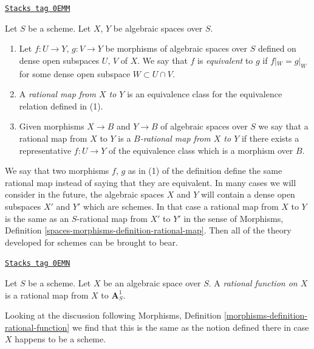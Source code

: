 \begin{definition}
\label{spaces-morphisms-definition-rational-map}
\href{https://stacks.math.columbia.edu/tag/0EMM}{\texttt{Stacks tag 0EMM}}

Let $S$ be a scheme. Let $X$, $Y$ be algebraic spaces over $S$.
\begin{enumerate}
\item Let $f : U \to Y$, $g : V \to Y$ be morphisms of algebraic spaces
over $S$ defined on dense open subspaces $U$, $V$ of $X$. We say that $f$ is
{\it equivalent} to $g$ if $f|_W = g|_W$ for some dense open
subspace $W \subset U \cap V$.
\item A {\it rational map from $X$ to $Y$}
is an equivalence class for the equivalence relation defined in (1).
\item Given morphisms $X \to B$ and $Y \to B$ of algebraic spaces over $S$
we say that a rational map from $X$ to $Y$ is a
{\it $B$-rational map from $X$ to $Y$}
if there exists a representative $f : U \to Y$ of the equivalence
class which is a morphism over $B$.
\end{enumerate}
\end{definition}

We say that two morphisms $f$, $g$ as in (1) of the definition
define the same rational map instead of saying that they are equivalent.
In many cases we will consider in the future, the algebraic spaces
$X$ and $Y$ will contain a dense open subspaces $X'$ and $Y'$ which
are schemes. In that case a rational map from $X$ to $Y$ is the same
as an $S$-rational map from $X'$ to $Y'$ in the sense of
Morphisms, Definition \ref{spaces-morphisms-definition-rational-map}.
Then all of the theory developed for schemes can be brought to bear.

\begin{definition}
\label{spaces-morphisms-definition-rational-function}
\href{https://stacks.math.columbia.edu/tag/0EMN}{\texttt{Stacks tag 0EMN}}

Let $S$ be a scheme. Let $X$ be an algebraic space over $S$. A
{\it rational function on $X$} is a rational map from $X$ to $\mathbf{A}^1_S$.
\end{definition}

Looking at the discussion following
Morphisms, Definition \ref{morphisms-definition-rational-function}
we find that this is the same as the notion defined there in case
$X$ happens to be a scheme.

